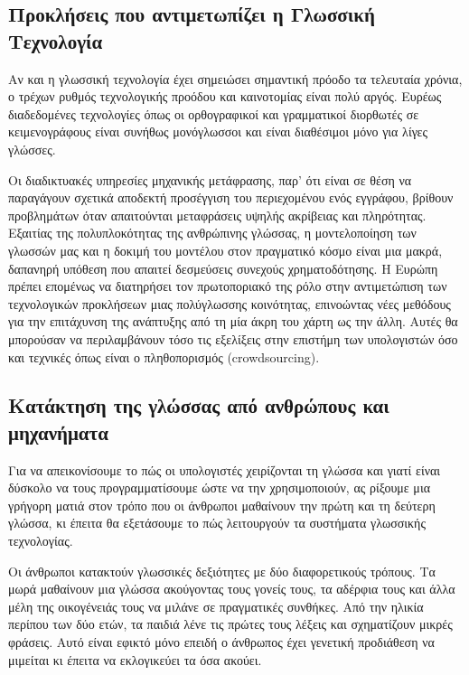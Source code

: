 \documentclass[]{../../metanetpaper}
\begin{document}
\begin{multicols}{2}
\subsection{Προκλήσεις που αντιμετωπίζει η Γλωσσική Τεχνολογία}

Αν και η γλωσσική τεχνολογία έχει σημειώσει σημαντική πρόοδο τα τελευταία χρόνια, ο τρέχων ρυθμός τεχνολογικής προόδου και καινοτομίας είναι πολύ αργός. Ευρέως διαδεδομένες τεχνολογίες όπως οι ορθογραφικοί και γραμματικοί διορθωτές σε κειμενογράφους είναι συνήθως μονόγλωσσοι και είναι διαθέσιμοι μόνο για λίγες γλώσσες.


Οι διαδικτυακές υπηρεσίες μηχανικής μετάφρασης, παρ' ότι είναι σε θέση να παραγάγουν σχετικά αποδεκτή προσέγγιση του περιεχομένου ενός εγγράφου, βρίθουν προβλημάτων όταν απαιτούνται μεταφράσεις υψηλής ακρίβειας και πληρότητας. Εξαιτίας της πολυπλοκότητας της ανθρώπινης γλώσσας, η μοντελοποίηση των γλωσσών μας και η δοκιμή του μοντέλου στον πραγματικό κόσμο είναι μια μακρά, δαπανηρή υπόθεση που απαιτεί δεσμεύσεις συνεχούς χρηματοδότησης. Η Ευρώπη πρέπει επομένως να διατηρήσει τον πρωτοποριακό της ρόλο στην αντιμετώπιση των τεχνολογικών προκλήσεων μιας πολύγλωσσης κοινότητας, επινοώντας νέες μεθόδους για την επιτάχυνση της ανάπτυξης από τη μία άκρη του χάρτη ως την άλλη. Αυτές θα μπορούσαν να περιλαμβάνουν τόσο τις εξελίξεις στην επιστήμη των υπολογιστών όσο και τεχνικές όπως είναι ο πληθοπορισμός (crowdsourcing).

\subsection{Κατάκτηση της γλώσσας από ανθρώπους και μηχανήματα}

Για να απεικονίσουμε το πώς οι υπολογιστές χειρίζονται τη γλώσσα και γιατί είναι δύσκολο να τους προγραμματίσουμε ώστε να την χρησιμοποιούν, ας ρίξουμε μια γρήγορη ματιά στον τρόπο που οι άνθρωποι μαθαίνουν την πρώτη και τη δεύτερη γλώσσα, κι έπειτα θα εξετάσουμε το πώς λειτουργούν τα συστήματα γλωσσικής τεχνολογίας.


Οι άνθρωποι κατακτούν γλωσσικές δεξιότητες με δύο διαφορετικούς τρόπους. Τα μωρά μαθαίνουν μια γλώσσα ακούγοντας τους γονείς τους, τα αδέρφια τους και άλλα μέλη της οικογένειάς τους να μιλάνε σε πραγματικές συνθήκες. Από την ηλικία περίπου των δύο ετών, τα παιδιά λένε τις πρώτες τους λέξεις και σχηματίζουν μικρές φράσεις. Αυτό είναι εφικτό μόνο επειδή ο άνθρωπος έχει γενετική προδιάθεση να μιμείται κι έπειτα να εκλογικεύει τα όσα ακούει. 


\end{multicols}
\end{document}
